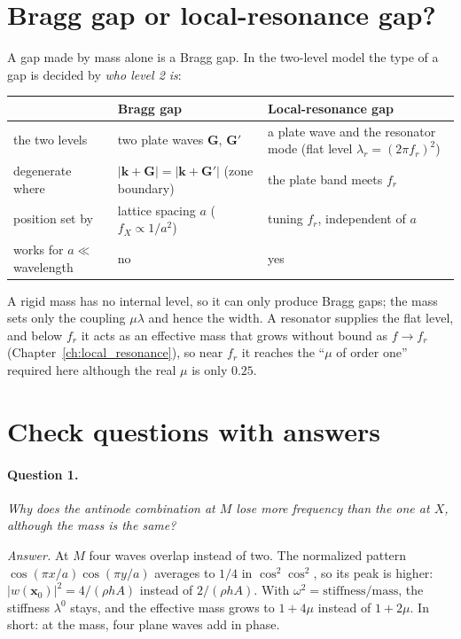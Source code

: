 \section{Bragg gap or local-resonance gap?}

A gap made by mass alone is a Bragg gap. In the two-level model the type of a gap
is decided by \emph{who level 2 is}:
\begin{center}
\begin{tabular}{|l|p{}|p{}|}
\hline
 & Bragg gap & Local-resonance gap \\
\hline
the two levels & two plate waves $\mathbf{G}$, $\mathbf{G}'$ & a plate wave and the resonator mode (flat level $\lambda_r = (2\pi f_r)^2$) \\
degenerate where & $|\mathbf{k}+\mathbf{G}| = |\mathbf{k}+\mathbf{G}'|$ (zone boundary) & the plate band meets $f_r$ \\
position set by & lattice spacing $a$ ($f_X \propto 1/a^2$) & tuning $f_r$, independent of $a$ \\
works for $a \ll$ wavelength & no & yes \\
\hline
\end{tabular}
\end{center}
A rigid mass has no internal level, so it can only produce Bragg gaps; the mass
sets only the coupling $\mu\lambda$ and hence the width. A resonator supplies the
flat level, and below $f_r$ it acts as an effective mass that grows without bound
as $f \to f_r$ (Chapter~\ref{ch:local_resonance}), so near $f_r$ it reaches the
``$\mu$ of order one'' required here although the real $\mu$ is only $0.25$.

\section{Check questions with answers}

\paragraph{Question 1.} \emph{Why does the antinode combination at $M$ lose
more frequency than the one at $X$, although the mass is the same?}

\emph{Answer.} At $M$ four waves overlap instead of two. The normalized
pattern $\cos(\pi x/a)\cos(\pi y/a)$ averages to $1/4$ in $\cos^2\cos^2$, so
its peak is higher: $|w(\mathbf{x}_0)|^2 = 4/(\rho h A)$ instead of
$2/(\rho h A)$. With $\omega^2 = \text{stiffness}/\text{mass}$, the stiffness
$\lambda^0$ stays, and the effective mass grows to $1 + 4\mu$ instead of
$1 + 2\mu$. In short: at the mass, four plane waves add in phase.

